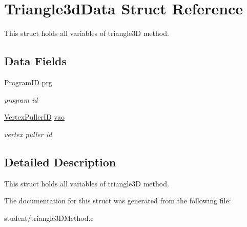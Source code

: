 \hypertarget{structTriangle3dData}{}\section{Triangle3d\+Data Struct Reference}
\label{structTriangle3dData}


This struct holds all variables of triangle3D method.  


\subsection*{Data Fields}
\begin{DoxyCompactItemize}
\item 
\mbox{\label{structTriangle3dData_abfd2853f289db26e7c2bef0bdc6930f5}} 
\hyperlink{student_2fwd_8h_a15e62786033208aec9487a51e808f81d}{Program\+ID} \hyperlink{structTriangle3dData_abfd2853f289db26e7c2bef0bdc6930f5}{prg}
\begin{DoxyCompactList}\small\item\em program id \end{DoxyCompactList}\item 
\mbox{\label{structTriangle3dData_a9718d80cf1299dcb8071fc3291fd48f3}} 
\hyperlink{student_2fwd_8h_a23828e2281a794e193ebaf0df3e1f17c}{Vertex\+Puller\+ID} \hyperlink{structTriangle3dData_a9718d80cf1299dcb8071fc3291fd48f3}{vao}
\begin{DoxyCompactList}\small\item\em vertex puller id \end{DoxyCompactList}\end{DoxyCompactItemize}


\subsection{Detailed Description}
This struct holds all variables of triangle3D method. 

The documentation for this struct was generated from the following file\+:\begin{DoxyCompactItemize}
\item 
student/triangle3\+D\+Method.\+c\end{DoxyCompactItemize}
